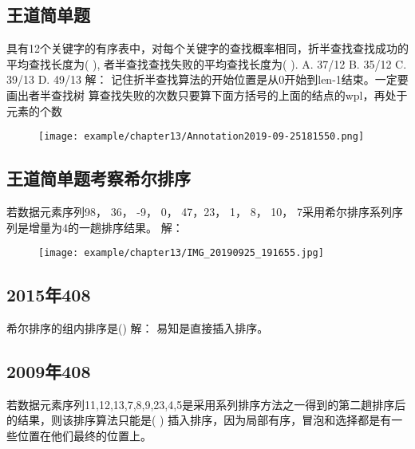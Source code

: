\subsection{王道简单题}
具有12个关键字的有序表中，对每个关键字的查找概率相同，折半查找查找成功的平均查找长度为(   ), 者半查找查找失败的平均查找长度为(  ).\newline
A. 37/12   B. 35/12 C. 39/13 D. 49/13 \newline
解：\newline
记住折半查找算法的开始位置是从0开始到len-1结束。一定要画出者半查找树\newline
算查找失败的次数只要算下面方括号的上面的结点的wpl，再处于元素的个数\newline
\begin{figure}[H]
	\centering  %
	\texttt{[image: example/chapter13/Annotation2019-09-25181550.png]}
\end{figure}

\subsection{王道简单题考察希尔排序}
若数据元素序列{98， 36， -9， 0， 47，23， 1， 8， 10， 7}采用希尔排序系列序列是增量为4的一趟排序结果。\newline
解：\newline
\begin{figure}[H]
	\centering  %
	\texttt{[image: example/chapter13/IMG\_20190925\_191655.jpg]}
\end{figure}

\subsection{2015年408}
希尔排序的组内排序是()\newline
解：\newline
易知是直接插入排序。\newline

\subsection{2009年408}
若数据元素序列{11,12,13,7,8,9,23,4,5}是采用系列排序方法之一得到的第二趟排序后的结果，则该排序算法只能是(   )\newline
插入排序，因为局部有序，冒泡和选择都是有一些位置在他们最终的位置上。\newline













